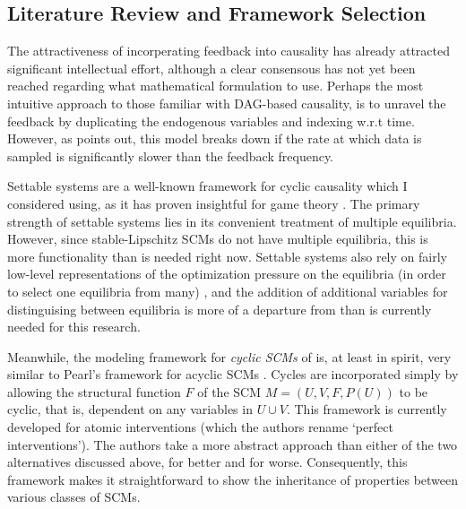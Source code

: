\documentclass[12pt]{article}
\begin{document}
\subsection{Literature Review and Framework Selection}

The attractiveness of incorperating feedback into causality has already attracted significant intellectual effort, although a clear consensous has not yet been reached regarding what mathematical formulation to use. Perhaps the most intuitive approach to those familiar with DAG-based causality, is to unravel the feedback by duplicating the endogenous variables and indexing w.r.t time. However, as \cite{LearningLinear} points out, this model breaks down if the rate at which data is sampled is significantly slower than the feedback frequency. 

Settable systems are a well-known framework for cyclic causality \cite{White&Chalak} which I considered using, as it has proven insightful for game theory \cite{GameIncomplete}. The primary strength of settable systems lies in its convenient treatment of multiple equilibria. However, since stable-Lipschitz SCMs do not have multiple equilibria, this is more functionality than is needed right now. Settable systems also rely on fairly low-level representations of the optimization pressure on the equilibria (in order to select one equilibria from many) \cite{CausalGames}, and the addition of additional variables for distinguising between equilibria is more of a departure from \cite{pearl_2009} than is currently needed for this research.

Meanwhile, the modeling framework for \emph{cyclic SCMs} of \cite{Foundations} is, at least in spirit, very similar to Pearl's framework for acyclic SCMs \cite{pearl_2009}.
Cycles are incorporated simply by allowing the structural function $F$ of the SCM $M=(U,V,F,P(U))$ to be cyclic, that is, dependent on any variables in $U\cup V$.
This framework is currently developed for atomic interventions (which the authors rename `perfect interventions').
The authors take a more abstract approach than either of the two alternatives discussed above, for better and for worse. Consequently, this framework makes it straightforward to show the inheritance of properties between various classes of SCMs.
\end{document}
